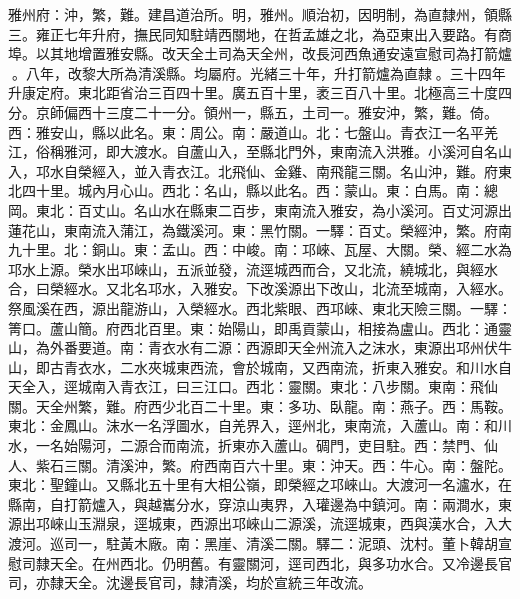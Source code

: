 \begin{pinyinscope}
雅州府：沖，繁，難。建昌道治所。明，雅州。順治初，因明制，為直隸州，領縣三。雍正七年升府，撫民同知駐靖西關地，在哲孟雄之北，為亞東出入要路。有商埠。以其地增置雅安縣。改天全土司為天全州，改長河西魚通安遠宣慰司為打箭爐。八年，改黎大所為清溪縣。均屬府。光緒三十年，升打箭爐為直隸。三十四年升康定府。東北距省治三百四十里。廣五百十里，袤三百八十里。北極高三十度四分。京師偏西十三度二十一分。領州一，縣五，土司一。雅安沖，繁，難。倚。西：雅安山，縣以此名。東：周公。南：嚴道山。北：七盤山。青衣江一名平羌江，俗稱雅河，即大渡水。自蘆山入，至縣北門外，東南流入洪雅。小溪河自名山入，邛水自榮經入，並入青衣江。北飛仙、金雞、南飛龍三關。名山沖，難。府東北四十里。城內月心山。西北：名山，縣以此名。西：蒙山。東：白馬。南：總岡。東北：百丈山。名山水在縣東二百步，東南流入雅安，為小溪河。百丈河源出蓮花山，東南流入蒲江，為鐵溪河。東：黑竹關。一驛：百丈。榮經沖，繁。府南九十里。北：銅山。東：孟山。西：中峻。南：邛崍、瓦屋、大關。榮、經二水為邛水上源。榮水出邛崍山，五派並發，流逕城西而合，又北流，繞城北，與經水合，曰榮經水。又北名邛水，入雅安。下改溪源出下改山，北流至城南，入經水。祭風溪在西，源出龍游山，入榮經水。西北紫眼、西邛崍、東北天險三關。一驛：箐口。蘆山簡。府西北百里。東：始陽山，即禹貢蒙山，相接為盧山。西北：通靈山，為外番要道。南：青衣水有二源：西源即天全州流入之沫水，東源出邛州伏牛山，即古青衣水，二水夾城東西流，會於城南，又西南流，折東入雅安。和川水自天全入，逕城南入青衣江，曰三江口。西北：靈關。東北：八步關。東南：飛仙關。天全州繁，難。府西少北百二十里。東：多功、臥龍。南：燕子。西：馬鞍。東北：金鳳山。沫水一名浮圖水，自羌界入，逕州北，東南流，入蘆山。南：和川水，一名始陽河，二源合而南流，折東亦入蘆山。碉門，吏目駐。西：禁門、仙人、紫石三關。清溪沖，繁。府西南百六十里。東：沖天。西：牛心。南：盤陀。東北：聖鐘山。又縣北五十里有大相公嶺，即榮經之邛崍山。大渡河一名瀘水，在縣南，自打箭爐入，與越巂分水，穿涼山夷界，入瓘邊為中鎮河。南：兩澗水，東源出邛崍山玉淵泉，逕城東，西源出邛崍山二源溪，流逕城東，西與漢水合，入大渡河。巡司一，駐黃木廠。南：黑崖、清溪二關。驛二：泥頭、沈村。董卜韓胡宣慰司隸天全。在州西北。仍明舊。有靈關河，逕司西北，與多功水合。又冷邊長官司，亦隸天全。沈邊長官司，隸清溪，均於宣統三年改流。


\end{pinyinscope}
